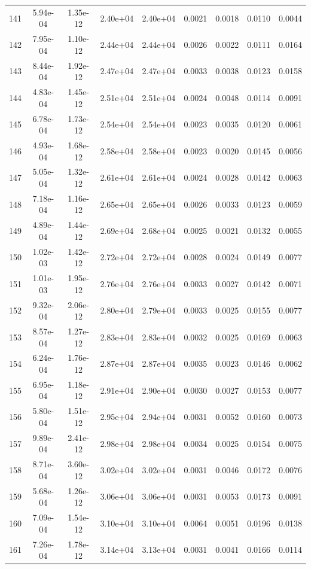 \begin{longtable}{ccccccccc}
141 & 5.94e-04 & 1.35e-12 & 2.40e+04 & 2.40e+04 & 0.0021 & 0.0018 & 0.0110 & 0.0044 \\
142 & 7.95e-04 & 1.10e-12 & 2.44e+04 & 2.44e+04 & 0.0026 & 0.0022 & 0.0111 & 0.0164 \\
143 & 8.44e-04 & 1.92e-12 & 2.47e+04 & 2.47e+04 & 0.0033 & 0.0038 & 0.0123 & 0.0158 \\
144 & 4.83e-04 & 1.45e-12 & 2.51e+04 & 2.51e+04 & 0.0024 & 0.0048 & 0.0114 & 0.0091 \\
145 & 6.78e-04 & 1.73e-12 & 2.54e+04 & 2.54e+04 & 0.0023 & 0.0035 & 0.0120 & 0.0061 \\
146 & 4.93e-04 & 1.68e-12 & 2.58e+04 & 2.58e+04 & 0.0023 & 0.0020 & 0.0145 & 0.0056 \\
147 & 5.05e-04 & 1.32e-12 & 2.61e+04 & 2.61e+04 & 0.0024 & 0.0028 & 0.0142 & 0.0063 \\
148 & 7.18e-04 & 1.16e-12 & 2.65e+04 & 2.65e+04 & 0.0026 & 0.0033 & 0.0123 & 0.0059 \\
149 & 4.89e-04 & 1.44e-12 & 2.69e+04 & 2.68e+04 & 0.0025 & 0.0021 & 0.0132 & 0.0055 \\
150 & 1.02e-03 & 1.42e-12 & 2.72e+04 & 2.72e+04 & 0.0028 & 0.0024 & 0.0149 & 0.0077 \\
151 & 1.01e-03 & 1.95e-12 & 2.76e+04 & 2.76e+04 & 0.0033 & 0.0027 & 0.0142 & 0.0071 \\
152 & 9.32e-04 & 2.06e-12 & 2.80e+04 & 2.79e+04 & 0.0033 & 0.0025 & 0.0155 & 0.0077 \\
153 & 8.57e-04 & 1.27e-12 & 2.83e+04 & 2.83e+04 & 0.0032 & 0.0025 & 0.0169 & 0.0063 \\
154 & 6.24e-04 & 1.76e-12 & 2.87e+04 & 2.87e+04 & 0.0035 & 0.0023 & 0.0146 & 0.0062 \\
155 & 6.95e-04 & 1.18e-12 & 2.91e+04 & 2.90e+04 & 0.0030 & 0.0027 & 0.0153 & 0.0077 \\
156 & 5.80e-04 & 1.51e-12 & 2.95e+04 & 2.94e+04 & 0.0031 & 0.0052 & 0.0160 & 0.0073 \\
157 & 9.89e-04 & 2.41e-12 & 2.98e+04 & 2.98e+04 & 0.0034 & 0.0025 & 0.0154 & 0.0075 \\
158 & 8.71e-04 & 3.60e-12 & 3.02e+04 & 3.02e+04 & 0.0031 & 0.0046 & 0.0172 & 0.0076 \\
159 & 5.68e-04 & 1.26e-12 & 3.06e+04 & 3.06e+04 & 0.0031 & 0.0053 & 0.0173 & 0.0091 \\
160 & 7.09e-04 & 1.54e-12 & 3.10e+04 & 3.10e+04 & 0.0064 & 0.0051 & 0.0196 & 0.0138 \\
161 & 7.26e-04 & 1.78e-12 & 3.14e+04 & 3.13e+04 & 0.0031 & 0.0041 & 0.0166 & 0.0114 \\

\end{longtable}
